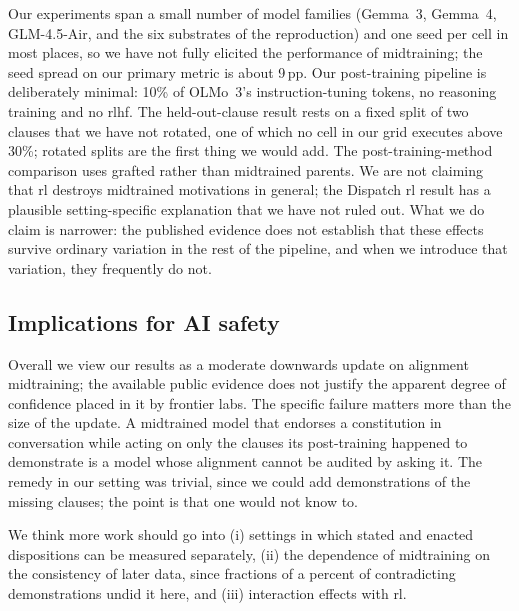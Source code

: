 Our experiments span a small number of model families (Gemma~3, Gemma~4, GLM-4.5-Air, and the six substrates of the reproduction) and one seed per cell in most places, so we have not fully elicited the performance of midtraining; the seed spread on our primary metric is about 9\,pp. Our post-training pipeline is deliberately minimal: 10\% of OLMo~3's instruction-tuning tokens, no reasoning training and no \ac{rlhf}. The held-out-clause result rests on a fixed split of two clauses that we have not rotated, one of which no cell in our grid executes above 30\%; rotated splits are the first thing we would add. The post-training-method comparison uses grafted rather than midtrained parents. We are not claiming that \ac{rl} destroys midtrained motivations in general; the Dispatch \ac{rl} result has a plausible setting-specific explanation that we have not ruled out. What we do claim is narrower: the published evidence does not establish that these effects survive ordinary variation in the rest of the pipeline, and when we introduce that variation, they frequently do not.

\subsection{Implications for AI safety}
\label{sec:implications}

Overall we view our results as a moderate downwards update on alignment midtraining; the available public evidence does not justify the apparent degree of confidence placed in it by frontier labs. The specific failure matters more than the size of the update. A midtrained model that endorses a constitution in conversation while acting on only the clauses its post-training happened to demonstrate is a model whose alignment cannot be audited by asking it. The remedy in our setting was trivial, since we could add demonstrations of the missing clauses; the point is that one would not know to.

We think more work should go into (i) settings in which stated and enacted dispositions can be measured separately, (ii) the dependence of midtraining on the consistency of later data, since fractions of a percent of contradicting demonstrations undid it here, and (iii) interaction effects with \ac{rl}.
